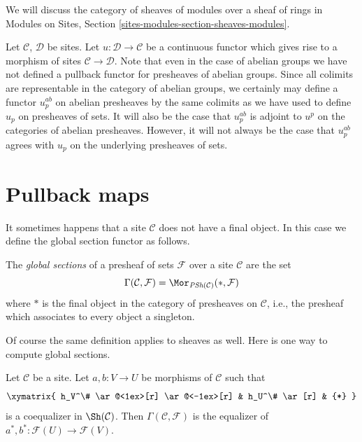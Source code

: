 \noindent
We will discuss the category of sheaves of modules over a sheaf of rings in
Modules on Sites, Section \ref{sites-modules-section-sheaves-modules}.

\begin{remark}
\label{remark-no-pullback-presheaves}
Let $\mathcal{C}$, $\mathcal{D}$ be sites.
Let $u : \mathcal{D} \to \mathcal{C}$ be a continuous functor
which gives rise to a morphism of sites $\mathcal{C} \to \mathcal{D}$.
Note that even in the case of abelian groups we have not defined
a pullback functor for presheaves of abelian groups.
Since all colimits are representable in
the category of abelian groups, we certainly may define
a functor $u_p^{ab}$ on abelian presheaves by the same colimits
as we have used to define $u_p$ on presheaves of sets.
It will also be the case that $u_p^{ab}$ is adjoint to
$u^p$ on the categories of abelian presheaves.
However, it will not always be the case that $u_p^{ab}$
agrees with $u_p$ on the underlying presheaves of sets.
\end{remark}












\section{Pullback maps}
\label{section-pullback}

\noindent
It sometimes happens that a site $\mathcal{C}$ does
not have a final object. In this case we define the
global section functor as follows.

\begin{definition}
\label{definition-global-sections}
The {\it global sections} of a presheaf of sets $\mathcal{F}$ over a
site $\mathcal{C}$ are the set
$$
\Gamma(\mathcal{C}, \mathcal{F}) =
\Mor_{\textit{PSh}(\mathcal{C})}(*, \mathcal{F})
$$
where $*$ is the final object in the category of presheaves on
$\mathcal{C}$, i.e., the presheaf which associates to every object
a singleton.
\end{definition}

\noindent
Of course the same definition applies to sheaves as well.
Here is one way to compute global sections.

\begin{lemma}
\label{lemma-compute-global-sections}
Let $\mathcal{C}$ be a site. Let $a, b : V \to U$ be morphisms of $\mathcal{C}$
such that
$$
\xymatrix{
h_V^\# \ar@<1ex>[r] \ar@<-1ex>[r] & h_U^\# \ar[r] & {*}
}
$$
is a coequalizer in $\Sh(\mathcal{C})$. Then
$\Gamma(\mathcal{C}, \mathcal{F})$ is the equalizer of
$a^*, b^* : \mathcal{F}(U) \to \mathcal{F}(V)$.
\end{lemma}

